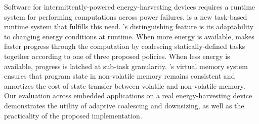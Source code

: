 Software for intermittently-powered energy-harvesting devices requires a
runtime system for performing computations across power failures.  \sys is a
new task-based runtime system that fulfills this need.  \sys's distinguishing
feature is its adaptability to changing energy conditions at runtime.  When
more energy is available, \sys makes faster progress through the computation by
coalescing statically-defined tasks together according to one of three proposed
policies. When less energy is available, progress is latched at sub-task
granularity. \sys's virtual memory system ensures that program state in
non-volatile memory remains consistent and amortizes the cost of state transfer
between volatile and non-volatile memory.  Our evaluation across embedded
applications on a real energy-harvesting device demonstrates the utility of
adaptive coalescing and downsizing, as well as the practicality of the proposed
implementation.
